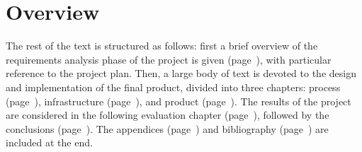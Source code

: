 \section*{Overview}\label{sec:overview}
The rest of the text is structured as follows: first a brief overview
of the requirements analysis phase of the project is given
(page~\pageref{chap:requirements}), with particular reference to the
project plan. Then, a large body of text is devoted to the design and
implementation of the final product, divided into three chapters:
process (page~\pageref{chap:process}), infrastructure
(page~\pageref{chap:infrastructure}), and product
(page~\pageref{chap:product}). The results of the project are
considered in the following evaluation chapter
(page~\pageref{chap:evaluation}), followed by the conclusions
(page~\pageref{chap:conclusions}). The appendices
(page~\pageref{appendices}) and bibliography
(page~\pageref{bibliography}) are included at the end.

